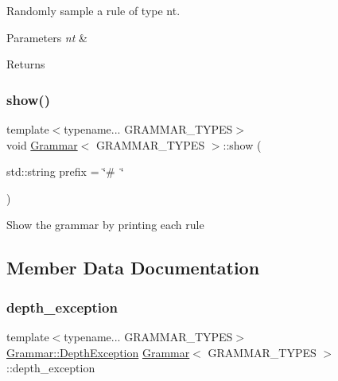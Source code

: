 Randomly sample a rule of type nt. 
\begin{DoxyParams}{Parameters}
{\em nt} & \\
\hline
\end{DoxyParams}
\begin{DoxyReturn}{Returns}

\end{DoxyReturn}
\mbox{\label{class_grammar_a8d661258f08b7cc4d154d59bfbbc1f68}} 
\subsubsection{\texorpdfstring{show()}{show()}}
{\footnotesize\ttfamily template$<$typename... G\+R\+A\+M\+M\+A\+R\+\_\+\+T\+Y\+P\+ES$>$ \\
void \hyperlink{class_grammar}{Grammar}$<$ G\+R\+A\+M\+M\+A\+R\+\_\+\+T\+Y\+P\+ES $>$\+::show (\begin{DoxyParamCaption}\item[{std\+::string}]{prefix = {\ttfamily \char`\"{}\#~\char`\"{}} }\end{DoxyParamCaption})\hspace{0.3cm}{\ttfamily [inline]}}

Show the grammar by printing each rule

\subsection{Member Data Documentation}
\mbox{\label{class_grammar_a3a9a86328940c89b66088b2807c88b68}} 
\subsubsection{\texorpdfstring{depth\+\_\+exception}{depth\_exception}}
{\footnotesize\ttfamily template$<$typename... G\+R\+A\+M\+M\+A\+R\+\_\+\+T\+Y\+P\+ES$>$ \\
 \hyperlink{class_grammar_1_1_depth_exception}{Grammar\+::\+Depth\+Exception}  \hyperlink{class_grammar}{Grammar}$<$ G\+R\+A\+M\+M\+A\+R\+\_\+\+T\+Y\+P\+ES $>$\+::depth\+\_\+exception}

\mbox{\label{class_grammar_a4a0d1d38426ce7f1b68c001e9ddec064}} 
